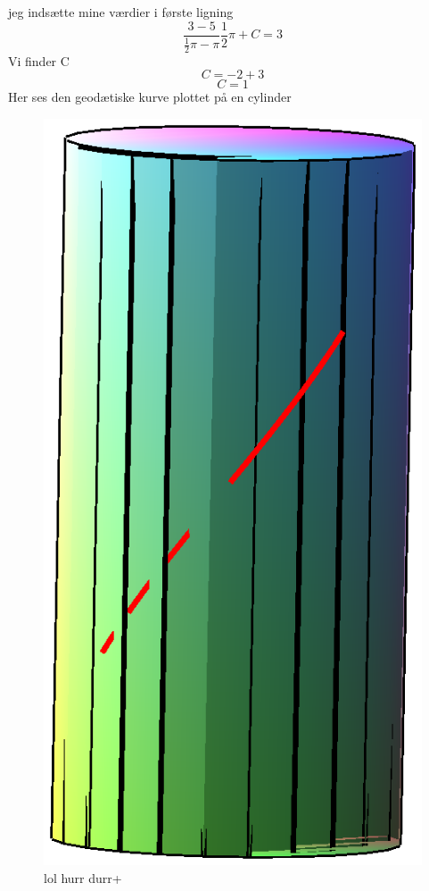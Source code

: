 \documentclass[12pt]{article}
\begin{document}
jeg indsætte mine værdier i første ligning
\begin{equation}
\frac{3-5}{\frac{1}{2}\pi-\pi}\frac{1}{2} \pi + C = 3
\end{equation}
Vi finder C
\begin{equation}
C = -2+3
\end{equation}
\begin{equation}
C = 1
\end{equation}
Her ses den geodætiske kurve plottet på en cylinder
\begin{figure}
\center
\includegraphics[scale=0.4]{pictures/Opg8_Fig1.eps}
\caption{lol hurr durr+}
\end{figure}
\end{document}

